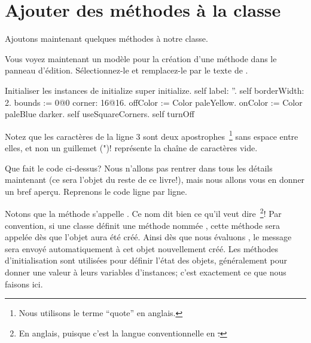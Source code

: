 \documentclass[a4paper,10pt,twoside]{book}
\begin{document}
\section{Ajouter des méthodes à la classe}

Ajoutons maintenant quelques méthodes à notre classe.

Vous voyez maintenant un modèle pour la création d'une méthode dans le panneau d'édition.
Sélectionnez-le et remplacez-le par le texte de .

\begin{numMethod}[scbecellinitialize]{Initialiser les instances de }
initialize
   super initialize.
   self label: ''.
   self borderWidth: 2.
   bounds := 0@0 corner: 16@16.
   offColor := Color paleYellow.
   onColor := Color paleBlue darker.
   self useSquareCorners.
   self turnOff
\end{numMethod}

\noindent
Notez que les caractères  de la ligne 3 sont deux
apostrophes~\footnote{Nous utilisons le terme ``quote'' en anglais.} 
sans espace entre elles, et non un guillemet (")!
 représente la chaîne de caractères vide.


Que fait le code ci-dessus?  Nous n'allons pas rentrer dans tous les
détails maintenant (ce sera l'objet du reste de ce livre!), mais nous
allons vous en donner un bref aperçu. Reprenons le code ligne par ligne.

Notons que la méthode s'appelle .
Ce nom dit bien ce qu'il veut dire~\footnote{En anglais, puisque c'est
  la langue conventionnelle en \st.}!
Par convention, si une classe définit une méthode nommée
, cette méthode sera appelée dès que l'objet aura été créé.
Ainsi dès que nous évaluons , le message  sera envoyé automatiquement à cet objet nouvellement créé.
Les méthodes d'initialisation sont utilisées pour définir l'état des objets, généralement pour donner une valeur à leurs variables d'instances; c'est exactement ce que nous faisons ici.
\end{document}
